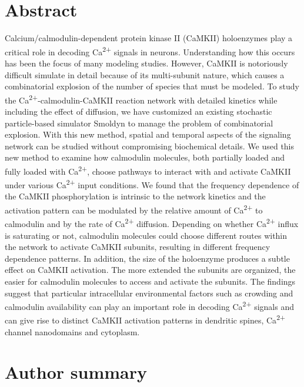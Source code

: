 \documentclass[10pt,letterpaper]{article}
\begin{document}
\section*{Abstract}
Calcium/calmodulin-dependent protein kinase II (CaMKII) holoenzymes play a critical role in decoding Ca\textsuperscript{2+} signals in neurons. Understanding how this occurs has been the focus of many modeling studies. However, CaMKII is notoriously difficult simulate in detail because of its multi-subunit nature, which causes a combinatorial explosion of the number of species that must be modeled. To study the Ca\textsuperscript{2+}-calmodulin-CaMKII reaction network with detailed kinetics while including the effect of diffusion, we have customized an existing stochastic particle-based simulator Smoldyn to manage the problem of combinatorial explosion. With this new method, spatial and temporal aspects of the signaling network can be studied without compromising biochemical details. We used this new method to examine how calmodulin molecules, both partially loaded and fully loaded with Ca\textsuperscript{2+}, choose pathways to interact with and activate CaMKII under various Ca\textsuperscript{2+} input conditions. We found that the frequency dependence of the CaMKII phosphorylation is intrinsic to the network kinetics and the activation pattern can be modulated by the relative amount of Ca\textsuperscript{2+} to calmodulin and by the rate of Ca\textsuperscript{2+} diffusion. Depending on whether Ca\textsuperscript{2+} influx is saturating or not, calmodulin molecules could choose different routes within the network to activate CaMKII subunits, resulting in different frequency dependence patterns. In addition, the size of the holoenzyme produces a subtle effect on CaMKII activation. The more extended the subunits are organized, the easier for calmodulin molecules to access and activate the subunits. The findings suggest that particular intracellular environmental factors such as crowding and calmodulin availability can play an important role in decoding Ca\textsuperscript{2+} signals and can give rise to distinct CaMKII activation patterns in dendritic spines, Ca\textsuperscript{2+} channel nanodomains and cytoplasm.
\section*{Author summary}
\end{document}
